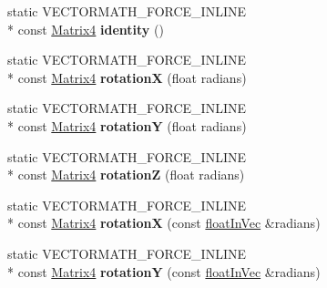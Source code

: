 \begin{DoxyCompactItemize}
\item 
\hypertarget{class_vectormath_1_1_aos_1_1_matrix4_a5e0e7343c349add9fdc3c392445a237a}{static V\+E\+C\+T\+O\+R\+M\+A\+T\+H\+\_\+\+F\+O\+R\+C\+E\+\_\+\+I\+N\+L\+I\+N\+E \\*
const \hyperlink{class_vectormath_1_1_aos_1_1_matrix4}{Matrix4} {\bfseries identity} ()}\label{class_vectormath_1_1_aos_1_1_matrix4_a5e0e7343c349add9fdc3c392445a237a}

\item 
\hypertarget{class_vectormath_1_1_aos_1_1_matrix4_a0f8e8cdfe45e0832b36e20b676124b5c}{static V\+E\+C\+T\+O\+R\+M\+A\+T\+H\+\_\+\+F\+O\+R\+C\+E\+\_\+\+I\+N\+L\+I\+N\+E \\*
const \hyperlink{class_vectormath_1_1_aos_1_1_matrix4}{Matrix4} {\bfseries rotation\+X} (float radians)}\label{class_vectormath_1_1_aos_1_1_matrix4_a0f8e8cdfe45e0832b36e20b676124b5c}

\item 
\hypertarget{class_vectormath_1_1_aos_1_1_matrix4_ac7323763ea9343c396c5e94bbd4a0495}{static V\+E\+C\+T\+O\+R\+M\+A\+T\+H\+\_\+\+F\+O\+R\+C\+E\+\_\+\+I\+N\+L\+I\+N\+E \\*
const \hyperlink{class_vectormath_1_1_aos_1_1_matrix4}{Matrix4} {\bfseries rotation\+Y} (float radians)}\label{class_vectormath_1_1_aos_1_1_matrix4_ac7323763ea9343c396c5e94bbd4a0495}

\item 
\hypertarget{class_vectormath_1_1_aos_1_1_matrix4_a94b36fc1b5b38772e8b22822a0e7a71f}{static V\+E\+C\+T\+O\+R\+M\+A\+T\+H\+\_\+\+F\+O\+R\+C\+E\+\_\+\+I\+N\+L\+I\+N\+E \\*
const \hyperlink{class_vectormath_1_1_aos_1_1_matrix4}{Matrix4} {\bfseries rotation\+Z} (float radians)}\label{class_vectormath_1_1_aos_1_1_matrix4_a94b36fc1b5b38772e8b22822a0e7a71f}

\item 
\hypertarget{class_vectormath_1_1_aos_1_1_matrix4_a319a56830e52f3672d5660696f317fa1}{static V\+E\+C\+T\+O\+R\+M\+A\+T\+H\+\_\+\+F\+O\+R\+C\+E\+\_\+\+I\+N\+L\+I\+N\+E \\*
const \hyperlink{class_vectormath_1_1_aos_1_1_matrix4}{Matrix4} {\bfseries rotation\+X} (const \hyperlink{class_vectormath_1_1float_in_vec}{float\+In\+Vec} \&radians)}\label{class_vectormath_1_1_aos_1_1_matrix4_a319a56830e52f3672d5660696f317fa1}

\item 
\hypertarget{class_vectormath_1_1_aos_1_1_matrix4_a1fb7c756de921a0dd673265ec772d3cf}{static V\+E\+C\+T\+O\+R\+M\+A\+T\+H\+\_\+\+F\+O\+R\+C\+E\+\_\+\+I\+N\+L\+I\+N\+E \\*
const \hyperlink{class_vectormath_1_1_aos_1_1_matrix4}{Matrix4} {\bfseries rotation\+Y} (const \hyperlink{class_vectormath_1_1float_in_vec}{float\+In\+Vec} \&radians)}\label{class_vectormath_1_1_aos_1_1_matrix4_a1fb7c756de921a0dd673265ec772d3cf}


\end{DoxyCompactItemize}
